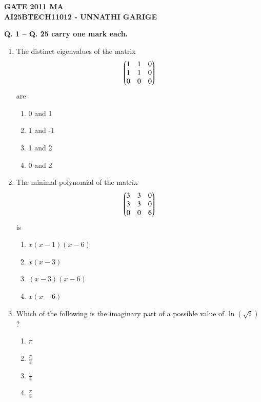 \documentclass[journal]{IEEEtran}
\numberwithin{equation}{enumi}
\numberwithin{figure}{enumi}
\begin{document}



\begin{center}
    \LARGE \textbf{GATE 2011 MA}\\[0.5em]
    \large \textbf{AI25BTECH11012 - UNNATHI GARIGE}
\end{center}

\noindent
\textbf{Q. 1 -- Q. 25 carry one mark each.}
\vspace{1em}


\begin{enumerate}


\item The distinct eigenvalues of the matrix
\begin{align*}
 \begin{pmatrix}
1 & 1 & 0 \\
1 & 1 & 0 \\
0 & 0 & 0
\end{pmatrix}
\end{align*}
are
\hfill{}
\begin{multicols}{4}
\begin{enumerate}
    \item 0 and 1
    \item 1 and -1
    \item 1 and 2 
    \item 0 and 2
\end{enumerate}
\end{multicols}


\item The minimal polynomial of the matrix
\begin{align*}
\begin{pmatrix}
3 & 3 & 0 \\
3 & 3 & 0 \\
0 & 0 & 6
\end{pmatrix}
\end{align*}
is
\hfill{}
\begin{multicols}{4}
\begin{enumerate}
    \item $x(x-1)(x-6)$
    \item $x(x-3)$
    \item $(x-3)(x-6)$
    \item  $x(x-6)$
\end{enumerate}
\end{multicols}



\item Which of the following is the imaginary part of a possible value of $\ln(\sqrt{i})$?
\hfill{}
\begin{multicols}{4}
\begin{enumerate}
    \item $\pi$
    \item $\frac{\pi}{2}$
    \item $\frac{\pi}{4}$ 
    \item  $\frac{\pi}{8}$
\end{enumerate}
\end{multicols}



\end{enumerate}
\end{document}
